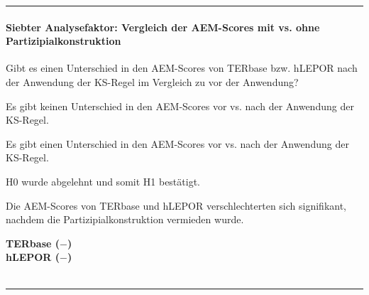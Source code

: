 \hrule
\paragraph*{Siebter Analysefaktor: Vergleich der AEM-Scores mit vs. ohne Partizipialkonstruktion}
\begin{description}[font=\normalfont\bfseries]
\item [Fragestellung:] Gibt es einen Unterschied in den AEM-Scores von TERbase bzw. hLEPOR nach der Anwendung der KS-Regel im Vergleich zu vor der Anwendung?
\item [H0 --] Es gibt keinen Unterschied in den AEM-Scores vor vs. nach der Anwendung der KS-Regel.
\item [H1 --] Es gibt einen Unterschied in den AEM-Scores vor vs. nach der Anwendung der KS-Regel.
\item [Resultat]
\end{description}
\noindent
\parbox[t]{.75\textwidth}{
H0 wurde abgelehnt und somit H1 bestätigt.

Die AEM-Scores von TERbase und hLEPOR verschlechterten sich signifikant, nachdem die Partizipialkonstruktion vermieden wurde.
}
\parbox[t]{.04\textwidth}{}
\colorbox{smGreen}{\parbox[t]{.2\textwidth}{
\textbf{TERbase ($-$)\\hLEPOR ($-$)}\\
\\
}}

\hrule
\newpage
